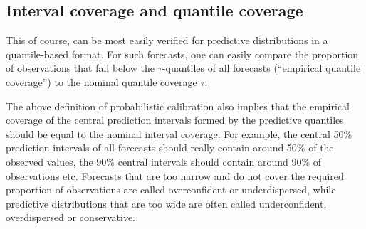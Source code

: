 \documentclass[
]{jss}
\begin{document}
\subsection{Interval coverage and quantile
coverage}\label{interval-coverage-and-quantile-coverage}

This of course, can be most easily verified for predictive distributions
in a quantile-based format. For such forecasts, one can easily compare
the proportion of observations that fall below the \(\tau\)-quantiles of
all forecasts (``empirical quantile coverage'') to the nominal quantile
coverage \(\tau\).

The above definition of probabilistic calibration also implies that the
empirical coverage of the central prediction intervals formed by the
predictive quantiles should be equal to the nominal interval coverage.
For example, the central 50\% prediction intervals of all forecasts
should really contain around 50\% of the observed values, the 90\%
central intervals should contain around 90\% of observations etc.
Forecasts that are too narrow and do not cover the required proportion
of observations are called overconfident or underdispersed, while
predictive distributions that are too wide are often called
underconfident, overdispersed or conservative.
\end{document}
